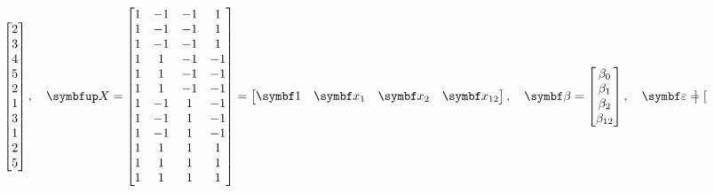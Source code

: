 \begin{itemize}
\begin{itemize}
\[\begin{bmatrix}
                            2 \\
                            3 \\
                            4 \\
                            5 \\
                            2 \\
                            1 \\
                            3 \\
                            1 \\
                            2 \\
                            5
                        \end{bmatrix},\quad\Matrix{X}=\begin{bmatrix}
                            1 & -1 & -1 & 1  \\
                            1 & -1 & -1 & 1  \\
                            1 & -1 & -1 & 1  \\
                            1 & 1  & -1 & -1 \\
                            1 & 1  & -1 & -1 \\
                            1 & 1  & -1 & -1 \\
                            1 & -1 & 1  & -1 \\
                            1 & -1 & 1  & -1 \\
                            1 & -1 & 1  & -1 \\
                            1 & 1  & 1  & 1  \\
                            1 & 1  & 1  & 1  \\
                            1 & 1  & 1  & 1
                        \end{bmatrix}=\begin{bmatrix}
                            \Vector{1} & \Vector{x}_1 & \Vector{x}_2 & \Vector{x}_{12}
                        \end{bmatrix},\quad\Vector{\beta}=\begin{bmatrix}
                            \beta_0 \\
                            \beta_1 \\
                            \beta_2 \\
                            \beta_{12}
                        \end{bmatrix},\quad\RandomVector{\varepsilon}=\begin{bmatrix}

\end{bmatrix}\]
\end{itemize}
\end{itemize}
